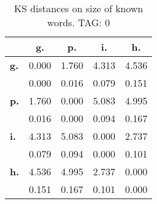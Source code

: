 \begin{table}[h!]
\begin{center}
\begin{tabular}{| l || c | c | c | c |}\hline
 & {\bf g.} & {\bf p.} & {\bf i.} & {\bf h.} \\\hline\hline
{\bf g.} & 0.000 & 1.760 & 4.313 & 4.536 \\
{\bf } & 0.000 & 0.016 & 0.079 & 0.151 \\\hline
{\bf p.} & 1.760 & 0.000 & 5.083 & 4.995 \\
{\bf } & 0.016 & 0.000 & 0.094 & 0.167 \\\hline
{\bf i.} & 4.313 & 5.083 & 0.000 & 2.737 \\
{\bf } & 0.079 & 0.094 & 0.000 & 0.101 \\\hline
{\bf h.} & 4.536 & 4.995 & 2.737 & 0.000 \\
{\bf } & 0.151 & 0.167 & 0.101 & 0.000 \\\hline
\end{tabular}
\caption{KS distances on size of known words. TAG: 0}
\end{center}
\end{table}